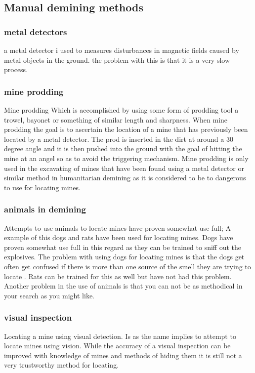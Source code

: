 \subsection{Manual demining methods}

\subsubsection*{metal detectors}

a metal detector i used to measures disturbances in magnetic fields caused by metal objects in the ground. the problem with this is that it is a very slow process.

\subsubsection*{mine prodding}
Mine prodding Which is accomplished by using some form of prodding tool a trowel, bayonet or something of similar length and sharpness. When mine prodding the goal is to ascertain the location of a mine that has previously been located by a metal detector. The prod is inserted in the dirt at around a 30 degree angle and it is then pushed into the ground with the goal of hitting the mine at an angel so as to avoid the triggering mechanism. Mine prodding is only used in the excavating of mines that have been found using a metal detector or similar method in humanitarian demining as it is considered to be to dangerous to use for locating mines.

\subsubsection*{animals in demining}
Attempts to use animals to locate mines have proven somewhat use full; A example of this dogs and rats have been used for locating mines. Dogs have proven somewhat use full in this regard as they can be trained to sniff out the explosives. The problem with using dogs for locating mines is that the dogs get often get confused if there is more than one source of the smell they are trying to locate \cite{DeminingDogs2016}. Rats can be trained for this as well but have not had this problem\cite{PouchedRats2016}. Another problem in the use of animals is that you can not be as methodical in your search as you might like.

\subsubsection*{visual inspection}
Locating a mine using visual detection. Is as the name implies to attempt to locate mines using vision. While the accuracy of a visual inspection can be improved with knowledge of mines and methods of hiding them it is still not a very trustworthy method for locating\cite{LandmineDetection2000}.

